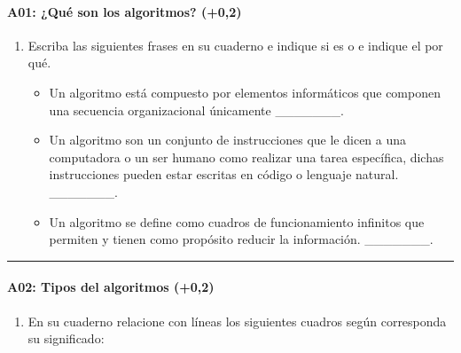 \documentclass[letterpaper,10pt,spanish]{sphinxmanual}
\begin{document}
\paragraph{A01: ¿Qué son los algoritmos? (+0,2)}
\label{\detokenize{cursos/ofimatica11/periodo01/G03:a01-que-son-los-algoritmos-0-2}}
\sphinxAtStartPar
{}
\begin{enumerate}
%
\item {} 
\sphinxAtStartPar
Escriba las siguientes frases en su cuaderno e indique si es  o  e indique el por qué.
\begin{itemize}
\item {} 
\sphinxAtStartPar
Un algoritmo está compuesto por elementos informáticos que componen una secuencia organizacional únicamente \_\_\_\_\_\_\_.

\item {} 
\sphinxAtStartPar
Un algoritmo son un conjunto de instrucciones que le dicen a una computadora o un ser humano como realizar una tarea específica, dichas instrucciones pueden estar escritas en código o lenguaje natural. \_\_\_\_\_\_\_.

\item {} 
\sphinxAtStartPar
Un algoritmo se define como cuadros de funcionamiento infinitos que permiten y tienen como propósito reducir la información. \_\_\_\_\_\_\_.

\end{itemize}

\end{enumerate}


\bigskip\hrule\bigskip



\paragraph{A02: Tipos del algoritmos (+0,2)}
\label{\detokenize{cursos/ofimatica11/periodo01/G03:a02-tipos-del-algoritmos-0-2}}
\sphinxAtStartPar
{}
\begin{enumerate}
%
\item {} 
\sphinxAtStartPar
En su cuaderno relacione con líneas los siguientes cuadros según corresponda su significado:

\end{enumerate}
\end{document}
